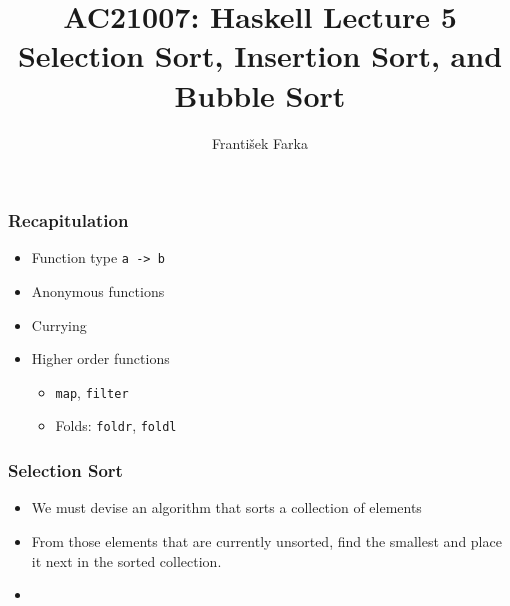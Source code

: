 \documentclass[final,handout]{beamer}
\title[Haskell Lecture 5]{AC21007: Haskell Lecture 5\\
    Selection Sort, Insertion Sort, and Bubble Sort
}
\author[Franti\v{s}ek Farka]{Franti\v{s}ek Farka}
\date{}
\newcommand\BackgroundPicture[1]{%
  \setbeamertemplate{background}{%
   \parbox[c][\paperheight]{\paperwidth}{%
      \vfill \hfill
\texttt{[image: \#1]}
        \hfill \vfill
     }}}
\begin{document}
\BackgroundPicture{fondo1.png}
\begin{frame}
\titlepage
\end{frame}

\begin{frame}[fragile]
    \frametitle{Recapitulation}

    \begin{itemize}
        \item Function type \texttt{a -> b}
        \item Anonymous functions
        \item Currying
        \item Higher order functions
            \begin{itemize}
                \item {\tt map}, {\tt filter}
                \item Folds: {\tt foldr}, {\tt foldl}
            \end{itemize}
  \end{itemize}
\end{frame}  


\begin{frame}[fragile]
    \frametitle{Selection Sort}

    \begin{itemize}
        \item<1->[Goal:] We must devise an algorithm that sorts a collection of
            elements 

        \item<2->[Solution:] From those elements that are currently unsorted, find
            the smallest and place it next in the sorted collection.

        \item<3->[Example:] ~\\ {\tt
            ~~~~~~~~~~~~~~~~~~~~~\\
            ~\\
            ~~~~~~~~~~~~~~~~~~~~~\\
            ~~~~~~~~~~~\\
            ~~~~~~~~~~~~~~~~~~\\
            ~~~~~~~~\\
            ~~~~~~~~~~~~~~~\\
            ~~~~~\\
            ~\\
            ~~\\
        }
    \end{itemize}
\end{frame}
\end{document}
